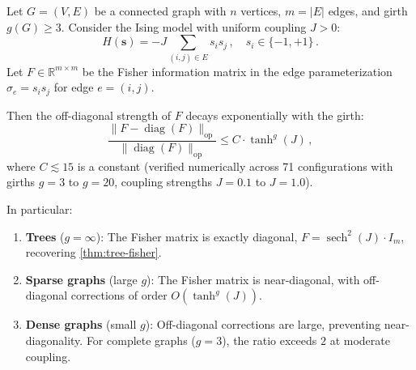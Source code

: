 
\begin{theorem}
\label{thm:near-diagonal-fisher}
Let $G = (V, E)$ be a connected graph with $n$ vertices, $m = |E|$ edges,
and girth $g(G) \geq 3$. Consider the Ising model with uniform coupling
$J > 0$:
\begin{equation}
H(\mathbf{s}) = -J \sum_{(i,j) \in E} s_i s_j\,, \quad s_i \in \{-1, +1\}\,.
\end{equation}
Let $F \in \mathbb{R}^{m \times m}$ be the Fisher information matrix in
the edge parameterization $\sigma_e = s_i s_j$ for edge $e = (i,j)$.

Then the off-diagonal strength of $F$ decays exponentially with the girth:
\begin{equation}
\label{eq:near-diagonal-bound}
\frac{\|F - \operatorname{diag}(F)\|_{\text{op}}}{\|\operatorname{diag}(F)\|_{\text{op}}}
\leq C \cdot \tanh^{g}(J)\,,
\end{equation}
where $C \lesssim 15$ is a constant (verified numerically across 71
configurations with girths $g = 3$ to $g = 20$, coupling strengths
$J = 0.1$ to $J = 1.0$).

In particular:
\begin{enumerate}
\item \textbf{Trees} ($g = \infty$): The Fisher matrix is exactly diagonal,
  $F = \operatorname{sech}^2(J) \cdot I_m$, recovering
  \cref{thm:tree-fisher}.

\item \textbf{Sparse graphs} (large $g$): The Fisher matrix is near-diagonal,
  with off-diagonal corrections of order $O(\tanh^g(J))$.

\item \textbf{Dense graphs} (small $g$): Off-diagonal corrections are large,
  preventing near-diagonality. For complete graphs ($g = 3$), the ratio
  exceeds $2$ at moderate coupling.
\end{enumerate}
\end{theorem}


